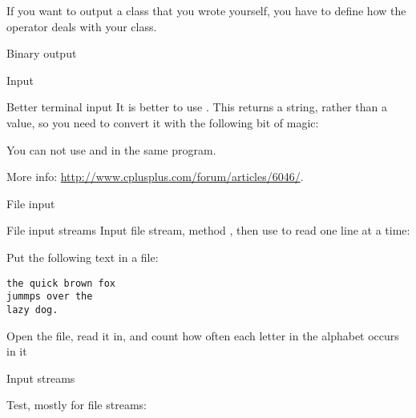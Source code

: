 If you want to output a class that you wrote yourself, you have to
define how the \n{<<} operator deals with your class.


 {Binary output}



 {Input}

\begin{block}{Better terminal input}
  \label{sl:getline}
  It is better to use . This returns a string,
  rather than a value, so you need to convert it with the following bit
  of magic:

  You can not use  and  in the same program.

  More info:
  \url{http://www.cplusplus.com/forum/articles/6046/}.

\end{block}

 {File input}

\begin{block}{File input streams}
  \label{sl:filein}
  Input file stream, method , then use
   to read one line at a time:
\end{block}

\begin{exercise}
  \label{ex:foxcount}
  Put the following text in a file:
\begin{verbatim}
the quick brown fox
jummps over the
lazy dog.
\end{verbatim}
  Open the file, read it in, and count how often each letter in the
  alphabet occurs in it
\end{exercise}

 {Input streams}

Test, mostly for file streams:  

